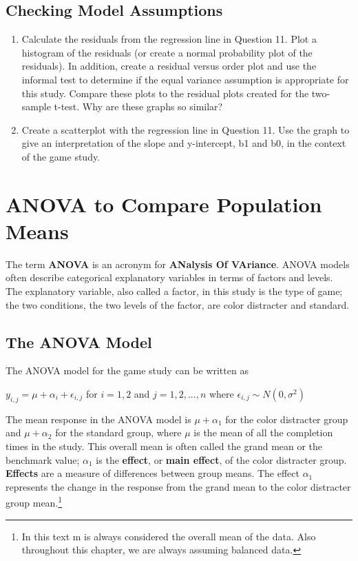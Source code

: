 \documentclass[
]{report}
\begin{document}
\subsection*{Checking Model Assumptions}\label{checking-model-assumptions}

\begin{enumerate}
\def\labelenumi{\arabic{enumi}.}
\setcounter{enumi}{13}
\item
  Calculate the residuals from the regression line in Question 11. Plot a histogram of the residuals (or create a normal probability plot of the residuals). In addition, create a residual versus order plot and use the informal test to determine if the equal variance assumption is appropriate for this study. Compare these plots to the residual plots created for the two-sample t-test. Why are these graphs so similar?
\item
  Create a scatterplot with the regression line in Question 11. Use the graph to give an interpretation of the slope and y-intercept, b1 and b0, in the context of the game study.
\end{enumerate}

\newpage

\section{ANOVA to Compare Population Means}\label{anova-to-compare-population-means}

The term \textbf{ANOVA} is an acronym for \textbf{ANalysis Of VAriance}. ANOVA models often describe categorical explanatory variables in terms of factors and levels. The explanatory variable, also called a factor, in
this study is the type of game; the two conditions, the two levels of the factor, are color distracter and standard.

\subsection{The ANOVA Model}\label{the-anova-model}

The ANOVA model for the game study can be written as

\(\label{2.6} y_{i,j} = \mu + \alpha_i + \epsilon_{i,j}\) for \(i = 1, 2\) and \(j = 1, 2, ... , n\) where \(\epsilon_{i,j} \sim N(0,\sigma^2) \tag{2.6}\)

The mean response in the ANOVA model is \(\mu + \alpha_1\) for the color distracter group and \(\mu + \alpha_2\) for the standard group, where \(\mu\) is the mean of all the completion times in the study. This overall mean is often called the grand mean or the benchmark value; \(\alpha_1\) is the \textbf{effect}, or \textbf{main effect}, of the color distracter group. \textbf{Effects} are a measure of differences between group means. The effect \(\alpha_1\) represents the change in the response from the grand mean to the color distracter group mean.\footnote{In this text m is always considered the overall mean of the data. Also throughout this chapter, we are always assuming balanced data.}
\end{document}

